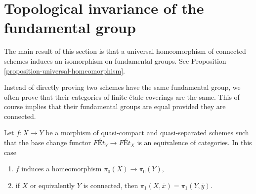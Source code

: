 \section{Topological invariance of the fundamental group}
\label{section-topological-invariance}

\noindent
The main result of this section is that a universal homeomorphism
of connected schemes induces an isomorphism on fundamental groups.
See Proposition \ref{proposition-universal-homeomorphism}.

\medskip\noindent
Instead of directly proving two schemes have the same fundamental
group, we often prove that their categories of finite \'etale
coverings are the same. This of course implies that
their fundamental groups are equal provided they are connected.

\begin{lemma}
\label{lemma-what-equivalence-gives}
Let $f : X \to Y$ be a morphism of quasi-compact and quasi-separated schemes
such that the base change functor $\textit{F\'Et}_Y \to \textit{F\'Et}_X$
is an equivalence of categories. In this case
\begin{enumerate}
\item $f$ induces a homeomorphism $\pi_0(X) \to \pi_0(Y)$,
\item if $X$ or equivalently $Y$ is connected, then
$\pi_1(X, \overline{x}) = \pi_1(Y, \overline{y})$.
\end{enumerate}
\end{lemma}

